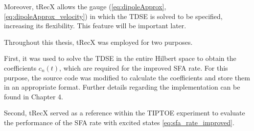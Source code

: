 Moreover, tRecX allows the gauge (\eqref{eq:dipoleApprox}, \eqref{eq:dipoleApprox_velocity}) in which the TDSE is solved to be specified, increasing its flexibility.
This feature will be important later.

\medskip
Throughout this thesis, tRecX was employed for two purposes.

First, it was used to solve the TDSE in the entire Hilbert space to obtain the coefficients $c_n(t)$, which are required for the improved SFA rate.
For this purpose, the source code was modified to calculate the coefficients and store them in an appropriate format.
Further details regarding the implementation can be found in Chapter 4.

Second, tRecX served as a reference within the TIPTOE experiment to evaluate the performance of the SFA rate with excited states \eqref{eq:sfa_rate_improved}.





